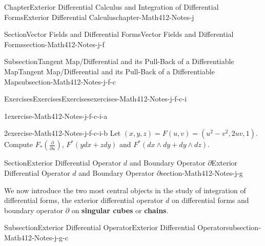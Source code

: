 \documentclass[oneside,10pt,]{book}
\newcommand{\terminology}[1]{\textbf{#1}}
\numberwithin{equation}{section}
\begin{document}
\begin{chapterptx}{Chapter}{Exterior Differential Calculus and Integration of Differential Forms}{}{Exterior Differential Calculus}{}{}{chapter-Math412-Notes-j}
\begin{sectionptx}{Section}{Vector Fields and Differential Forms}{}{Vector Fields and Differential Forms}{}{}{section-Math412-Notes-j-f}
\begin{subsectionptx}{Subsection}{Tangent Map\slash{}Differential and its Pull-Back of a Differentiable Map}{}{Tangent Map\slash{}Differential and its Pull-Back of a Differentiable Map}{}{}{subsection-Math412-Notes-j-f-c}
\begin{exercises-subsubsection-numberless}{Exercises}{Exercises}{}{Exercises}{}{}{exercises-Math412-Notes-j-f-c-i}
\begin{divisionexercise}{1}{}{}{exercise-Math412-Notes-j-f-c-i-a}
\begin{enumerate}[label=(\alph*)]
\end{enumerate}
%
\end{divisionexercise}%
\begin{divisionexercise}{2}{}{}{exercise-Math412-Notes-j-f-c-i-b}%
Let \((x, y, z)=F(u, v)=(u^{2}-v^{2}, 2u v, 1)\). Compute \(F_{*}(\frac{\partial }{\partial u})\), \(F^{*}(y dx + z dy)\) and \(F^{*}(dx\wedge dy + dy\wedge dz)\).%
\end{divisionexercise}%
\end{exercises-subsubsection-numberless}
\end{subsectionptx}
\end{sectionptx}
%
%
\typeout{************************************************}
\typeout{************************************************}
%
\begin{sectionptx}{Section}{Exterior Differential Operator \(d\) and Boundary Operator \(\partial\)}{}{Exterior Differential Operator \(d\) and Boundary Operator \(\partial\)}{}{}{section-Math412-Notes-j-g}
\begin{introduction}{}%
We now introduce the two most central objects in the study of integration of differential forms, the exterior differential operator \(d\) on differential forms and boundary operator \(\partial\) on \terminology{singular cubes} or \terminology{chains}.%
\end{introduction}%
%
%
\typeout{************************************************}
\typeout{************************************************}
%
\begin{subsectionptx}{Subsection}{Exterior Differential Operator}{}{Exterior Differential Operator}{}{}{subsection-Math412-Notes-j-g-c}

\end{subsectionptx}
\end{sectionptx}
\end{chapterptx}
\end{document}
